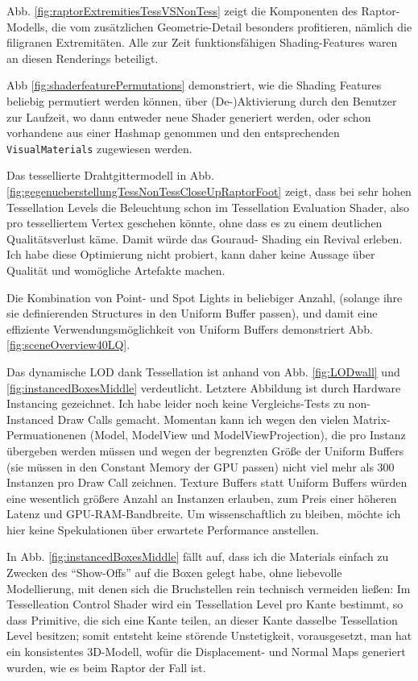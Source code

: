 	Abb. \ref{fig:raptorExtremitiesTessVSNonTess} zeigt die Komponenten des Raptor-Modells, die vom
	zusätzlichen Geometrie-Detail besonders profitieren, nämlich die filigranen Extremitäten.
	Alle zur Zeit funktionsfähigen Shading-Features waren an diesen Renderings beteiligt.
	
	Abb \ref{fig:shaderfeaturePermutations} demonstriert, wie die Shading Features beliebig permutiert werden können,
	über (De-)Aktivierung durch den Benutzer zur Laufzeit, wo dann entweder neue Shader generiert werden, oder schon 
	vorhandene aus einer Hashmap genommen und den entsprechenden \lstinline|VisualMaterials| zugewiesen werden.
	
	Das tessellierte Drahtgittermodell in Abb. \ref{fig:gegenueberstellungTessNonTessCloseUpRaptorFoot}
	zeigt, dass bei sehr hohen Tessellation Levels die Beleuchtung schon im Tessellation Evaluation Shader,
	also pro tesselliertem Vertex geschehen könnte, ohne dass es zu einem deutlichen Qualitätsverlust käme.
	Damit würde das Gouraud- Shading ein Revival erleben. Ich habe diese Optimierung nicht probiert, kann daher 
	keine Aussage über Qualität und womögliche Artefakte machen.
	
	Die Kombination von Point- und Spot Lights in beliebiger Anzahl, (solange ihre sie definierenden
	Structures in den Uniform Buffer passen), und damit eine effiziente Verwendungsmöglichkeit von
	Uniform Buffers demonstriert Abb. \ref{fig:sceneOverview40LQ}.
	
	Das dynamische LOD dank Tessellation ist anhand von Abb. \ref{fig:LODwall} und \ref{fig:instancedBoxesMiddle}
	verdeutlicht. Letztere Abbildung ist durch Hardware Instancing gezeichnet. Ich habe leider noch keine 
	Vergleichs-Tests zu non-Instanced Draw Calls gemacht. Momentan kann ich wegen den vielen Matrix-Permuationenen
	(Model, ModelView und ModelViewProjection), die pro Instanz übergeben werden müssen und wegen der 
	begrenzten Größe der Uniform Buffers (sie müssen in den	Constant Memory der GPU passen) nicht viel mehr als 300
	Instanzen pro Draw Call zeichnen. Texture Buffers statt Uniform Buffers würden eine wesentlich größere
	Anzahl an Instanzen erlauben, zum Preis einer höheren Latenz und GPU-RAM-Bandbreite. Um wissenschaftlich zu bleiben,
	möchte ich hier keine Spekulationen über erwartete Performance anstellen.
	
	In Abb. \ref{fig:instancedBoxesMiddle} fällt auf, dass ich die Materials einfach zu Zwecken des "`Show-Offs"'
	auf die Boxen gelegt habe, ohne liebevolle Modellierung, mit denen sich die Bruchstellen rein technisch
	vermeiden ließen:
	Im Tesselleation Control Shader wird ein Tessellation Level pro Kante bestimmt, so dass Primitive, die sich eine
	Kante teilen, an dieser Kante dasselbe Tessellation Level besitzen; somit entsteht keine störende Unstetigkeit,
	vorausgesetzt, man hat ein konsistentes 3D-Modell, wofür die Displacement- und Normal Maps 
	generiert wurden, wie es beim Raptor der Fall ist.
	



